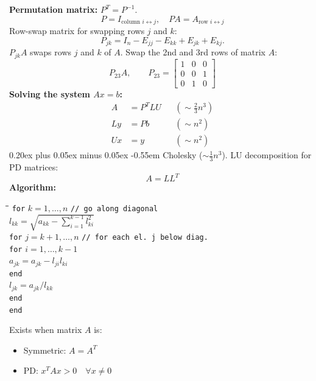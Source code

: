 \documentclass[10pt,a4paper]{article}
\makeatletter
\newcommand{\sheetfontsize}{\fontsize{7.5pt}{8.4pt}\selectfont}
\renewcommand\subsection{\@startsection{subsection}{2}{\z@}%
  {0.20ex plus 0.05ex minus 0.05ex}%
  {-0.55em}%
  {\normalfont\sheetfontsize\bfseries}}
\makeatother
\begin{document}
\begin{multicols*}{4}
\textbf{Permutation matrix:} $P^T=P^{-1}$.
\[
  P = I_{\text{column }i \leftrightarrow j},
  \quad PA = A_{\text{row }i \leftrightarrow j}
\]
Row-swap matrix for swapping rows $j$ and $k$:
\[
  P_{jk}=I_n-E_{jj}-E_{kk}+E_{jk}+E_{kj}.
\]
$P_{jk}A$ swaps
rows $j$ and $k$ of $A$.
Swap the 2nd and 3rd rows of matrix $A$:
\[
  P_{23}A,\qquad
  P_{23} = \begin{bmatrix}
        1 & 0 & 0 \\
        0 & 0 & 1 \\
        0 & 1 & 0
      \end{bmatrix}
\]
\textbf{Solving the system $Ax=b$:}
\begin{align*}
  A &= P^T LU             &&(\sim \tfrac{2}{3}n^3) \\
  Ly &= Pb                &&(\sim n^2) \\
  Ux &= y                 &&(\sim n^2)
\end{align*}
\subsection{\texorpdfstring{Cholesky ($\sim\frac{1}{3}n^3$).}
  {Cholesky (1/3 n3).}}
LU decomposition for PD matrices:
\[
  A = LL^T
\]
\textbf{Algorithm:}
\begin{tiny}
\begin{tabbing}
\hspace{1.0em}\=\hspace{1.0em}\=\hspace{1.0em}\=\kill
\texttt{for} $k=1,\ldots,n$ \texttt{// go along diagonal}\\
\> $l_{kk}=\sqrt{a_{kk}-\sum_{i=1}^{k-1}l_{ki}^2}$ \\
\> \texttt{for} $j=k+1,\ldots,n$ \texttt{// for each el. j below diag.} \\
\> \> \texttt{for} $i=1,\ldots,k-1$ \\
\> \> \> $a_{jk}=a_{jk}-l_{ji}l_{ki}$ \\
\> \> \texttt{end} \\
\> \> $l_{jk}=a_{jk}/l_{kk}$ \\
\> \texttt{end} \\
\texttt{end}
\end{tabbing}
\end{tiny}
Exists when matrix $A$ is:
\begin{itemize}
  \item Symmetric: $A=A^T$
  \item PD: $x^T Ax>0 \quad \forall x \neq 0$
\end{itemize}


\end{multicols*}
\end{document}
